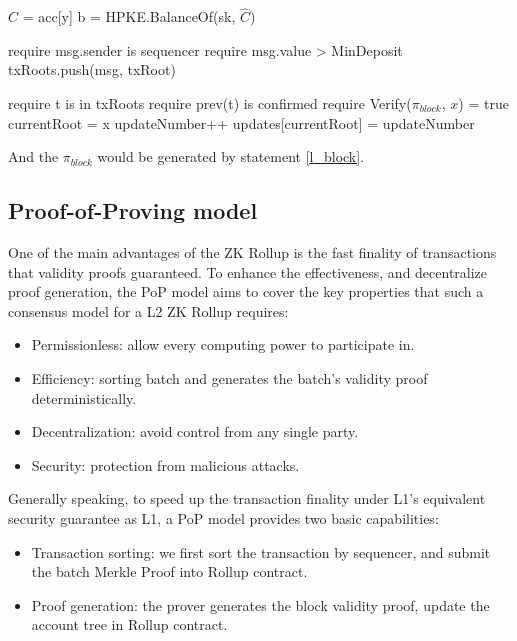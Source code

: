 \documentclass{article}
\begin{document}
\begin{algorithm}
\begin{multicols}{2}
   {
    $\hat{C}$ = acc[y] \;
    b = HPKE.BalanceOf(sk, $\hat{C}$) \;
  }
  
   {
     require msg.sender is sequencer \;
     require msg.value > MinDeposit \;
     txRoots.push({msg, txRoot}) \;
  }
  
   {
    
    require t is in txRoots \;
    require prev(t) is confirmed \;
    require Verify($\pi_{block}$, $x$) = true \;
    currentRoot = x \;
    updateNumber++ \;
    updates[currentRoot] = updateNumber \;
  }
\end{multicols}

\end{algorithm}
And the $\pi_{block}$ would be generated by statement \ref{l_block}.



\subsection{Proof-of-Proving model}

One of the main advantages of the ZK Rollup is the fast finality of transactions that validity proofs guaranteed. To enhance the effectiveness, and decentralize proof generation, the PoP model aims to cover the key properties that such a consensus model for a L2 ZK Rollup requires:
\begin{itemize}
    \item Permissionless: allow every computing power to participate in.
    \item Efficiency: sorting batch and generates the batch's validity proof deterministically.
    \item Decentralization: avoid control from any single party.
    \item Security: protection from malicious attacks.
\end{itemize}

Generally speaking, to speed up the transaction finality under L1's equivalent security guarantee as L1, a PoP model provides two basic capabilities:

\begin{itemize}
    \item Transaction sorting: we first sort the transaction by sequencer, and submit the batch Merkle Proof into Rollup contract.
    \item Proof generation: the prover generates the block validity proof, update the account tree in Rollup contract.
\end{itemize}
\end{document}
